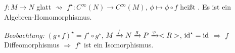 \begin{definition}
	$f\colon M\to N$ glatt $\rightsquigarrow$ $f^\star\colon C^\infty(N)\to C^\infty(M)$, $\phi\mapsto \phi\circ f$ heißt . Es ist ein Algebren-Homomorphismus.
\end{definition}

\emph{Beobachtung:} $(g\circ f)^\star = f^\star\circ g^\star$, $M\xrightarrow f N\xrightarrow g P \xrightarrow{\varphi} <R>$, $\operatorname{id}^\star = \operatorname{id}$ $\Rightarrow$ $f$ Diffeomorphismus $\Rightarrow$ $f^\star$ ist ein Isomorphismus.